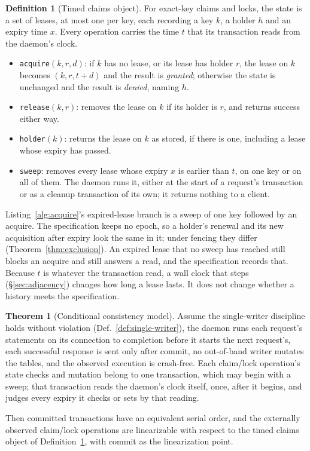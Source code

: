 \documentclass[11pt,a4paper]{article}
\theoremstyle{definition}
\newtheorem{definition}{Definition}[section]
\newtheorem{theorem}{Theorem}[section]
\theoremstyle{remark}
\begin{document}
\begin{definition}[Timed claims object]\label{def:swk-timed-claims}
\setlength{\parskip}{4pt plus 1pt}
For exact-key claims and locks, the state is a set of leases, at most one per
key, each recording a key $k$, a holder $h$ and an expiry time $x$. Every
operation carries the time $t$ that its transaction reads from the daemon's
clock.
\begin{itemize}[leftmargin=1.4em,itemsep=1pt]
  \item \texttt{acquire}$(k,r,d)$: if $k$ has no lease, or its lease has holder
  $r$, the lease on $k$ becomes $(k,r,t+d)$ and the result is \emph{granted};
  otherwise the state is unchanged and the result is \emph{denied}, naming $h$.
  \item \texttt{release}$(k,r)$: removes the lease on $k$ if its holder is $r$,
  and returns success either way.
  \item \texttt{holder}$(k)$: returns the lease on $k$ as stored, if there is
  one, including a lease whose expiry has passed.
  \item \texttt{sweep}: removes every lease whose expiry $x$ is earlier than
  $t$, on one key or on all of them. The daemon runs it, either at the start of
  a request's transaction or as a cleanup transaction of its own; it returns
  nothing to a client.
\end{itemize}
\end{definition}

Listing~\ref{alg:acquire}'s expired-lease branch is a sweep of one key
followed by an acquire. The specification keeps no epoch, so a holder's
renewal and its new acquisition after expiry look the same in it; under
fencing they differ (Theorem~\ref{thm:exclusion}). An expired lease that no sweep has reached still blocks an
acquire and still answers a read, and the specification records that.
Because $t$ is whatever the transaction
read, a wall clock that steps (\S\ref{sec:adjacency}) changes how long a lease
lasts. It does not change whether a history meets the specification.

\begin{theorem}[Conditional consistency model]\label{thm:consistency}
\setlength{\parskip}{4pt plus 1pt}
Assume the single-writer discipline holds without violation (Def.~\ref{def:single-writer}), the daemon runs each request's statements on its connection to completion before it starts the next request's, each successful response is sent only after commit, no out-of-band writer mutates the tables, and the observed execution is crash-free. Each claim/lock operation's state checks and mutation belong to one transaction, which may begin with a sweep; that transaction reads the daemon's clock itself, once, after it begins, and judges every expiry it checks or sets by that reading.

Then committed transactions have an equivalent serial order, and the externally observed
claim/lock operations are linearizable with respect to the timed claims object of
Definition~\ref{def:swk-timed-claims}, with commit as the linearization point.
\end{theorem}
\end{document}
